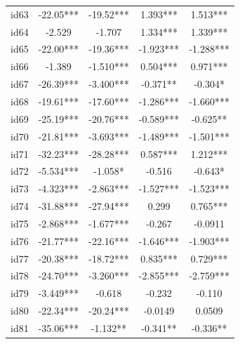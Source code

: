 \documentclass[num-refs]{wiley-article}
\begin{document}
\begin{center}
\begin{longtable}{ccccc}
id63                     & -22.05*** & -19.52***      & 1.393***          & 1.513***          \\
id64                     & -2.529    & -1.707         & 1.334***          & 1.339***          \\
id65                     & -22.00*** & -19.36***      & -1.923***         & -1.288***         \\
id66                     & -1.389    & -1.510***      & 0.504***          & 0.971***          \\
id67                     & -26.39*** & -3.400***      & -0.371**          & -0.304*           \\
id68                     & -19.61*** & -17.60***      & -1.286***         & -1.660***         \\
id69                     & -25.19*** & -20.76***      & -0.589***         & -0.625**          \\
id70                     & -21.81*** & -3.693***      & -1.489***         & -1.501***         \\
id71                     & -32.23*** & -28.28***      & 0.587***          & 1.212***          \\
id72                     & -5.534*** & -1.058*        & -0.516            & -0.643*           \\
id73                     & -4.323*** & -2.863***      & -1.527***         & -1.523***         \\
id74                     & -31.88*** & -27.94***      & 0.299             & 0.765***          \\
id75                     & -2.868*** & -1.677***      & -0.267            & -0.0911           \\
id76                     & -21.77*** & -22.16***      & -1.646***         & -1.903***         \\
id77                     & -20.38*** & -18.72***      & 0.835***          & 0.729***          \\
id78                     & -24.70*** & -3.260***      & -2.855***         & -2.759***         \\
id79                     & -3.449*** & -0.618         & -0.232            & -0.110            \\
id80                     & -22.34*** & -20.24***      & -0.0149           & 0.0509            \\
id81                     & -35.06*** & -1.132**       & -0.341**          & -0.336**          \\

\end{longtable}
\end{center}
\end{document}
